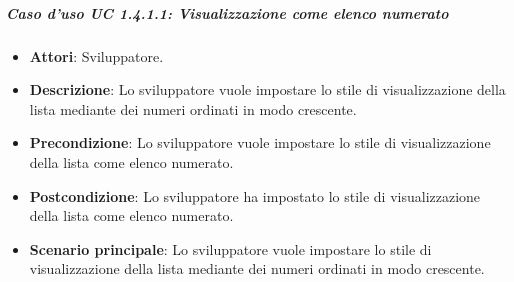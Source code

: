 \subparagraph{Caso d'uso UC 1.4.1.1: Visualizzazione come elenco numerato}

\FloatBarrier
\begin{itemize}
\item\textbf{Attori}: Sviluppatore.
\item\textbf{Descrizione}: Lo sviluppatore vuole impostare lo stile di visualizzazione della lista mediante dei numeri ordinati in modo crescente.
\item\textbf{Precondizione}: Lo sviluppatore vuole impostare lo stile di visualizzazione della lista come elenco numerato.
\item\textbf{Postcondizione}: Lo sviluppatore ha impostato lo stile di visualizzazione della lista come elenco numerato.
\item\textbf{Scenario principale}: Lo sviluppatore vuole impostare lo stile di visualizzazione della lista mediante dei numeri ordinati in modo crescente.
\end{itemize}
